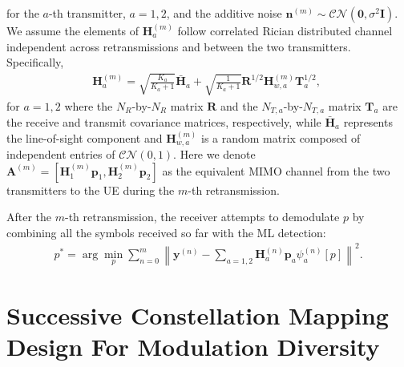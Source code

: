\documentclass[journal]{IEEEtran}
\begin{document}
for the $a$-th transmitter, $a=1, 2$, and the additive noise
$\mathbf{n}^{(m)}\sim\mathcal{CN}(\mathbf{0}, \sigma^2\mathbf{I})$. We
assume the elements of $\mathbf{H}_a^{(m)}$ follow correlated Rician
distributed channel~\cite{taricco2007optimum} independent across retransmissions
and between the two transmitters.
Specifically,
\begin{align}
    \mathbf{H}_a^{(m)} = \sqrt{\frac{K_a}{K_a+1}}\bar{\mathbf{H}}_{a} +
    \sqrt{\frac{1}{K_a+1}}
    \mathbf{R}^{1/2}\mathbf{H}_{w,a}^{(m)}\mathbf{T}_a^{1/2},\; 
\end{align}
for $a=1,2$ where the $N_R$-by-$N_R$ matrix $\mathbf{R}$ and the $N_{T,
a}$-by-$N_{T,a}$ matrix $\mathbf{T}_a$ are the receive and transmit covariance matrices,
respectively, while $\bar{\mathbf{H}}_{a}$ represents the line-of-sight
component and $\mathbf{H}_{w,a}^{(m)}$ is a random matrix composed of
independent entries of $\mathcal{CN}(0,1)$. Here we denote $\mathbf{A}^{(m)} =
[\mathbf{H}_1^{(m)}\mathbf{p}_1, \mathbf{H}_2^{(m)}\mathbf{p}_2]$ as the
equivalent MIMO channel from the two transmitters to the UE during the $m$-th
retransmission.

After the $m$-th retransmission, the receiver attempts to
demodulate $p$ by combining all the symbols received so far with the ML
detection:
\begin{align}
    p^* = \arg\min_p\sum_{n = 0}^{m}\left\|\mathbf{y}^{(n)} -
    \sum_{a=1,2}\mathbf{H}_a^{(n)}\mathbf{p}_a\psi_a^{(n)}[p]\right\|^2.
\end{align}

\section{Successive Constellation Mapping Design For Modulation Diversity}
\label{sec:modiv}
\end{document}

